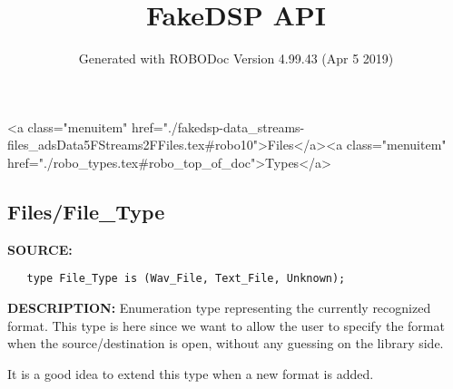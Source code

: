 \documentclass{article}
\title{FakeDSP API}
\author{Generated with ROBODoc Version 4.99.43 (Apr  5 2019)
}
\begin{document}
\maketitle
\printindex
\tableofcontents
\newpage

<a class="menuitem" href="./fakedsp-data_streams-files_adsData5FStreams2FFiles.tex#robo10">Files</a><a class="menuitem" href="./robo_types.tex#robo_top_of_doc">Types</a>\subsection{Files/File\_Type}
\textbf{SOURCE:}\hspace{0.08in}\begin{verbatim}
   type File_Type is (Wav_File, Text_File, Unknown);
\end{verbatim}
\textbf{DESCRIPTION:}\hspace{0.08in}
   Enumeration type representing the currently recognized format.
   This type is here since we want to allow the user to specify
   the format when the source/destination is open, without
   any guessing on the library side.



   It is a good idea to extend this type when a new format is added.
\end{document}
